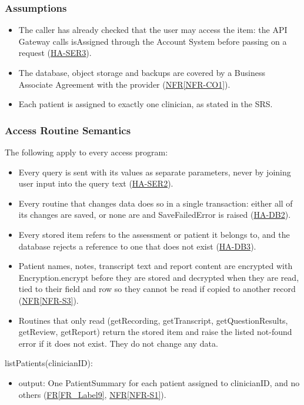\documentclass[12pt, titlepage]{article}
\newcommand{\srsref}[2]{\href{https://github.com/Nour-Fawaz/MacaBoca/blob/main/pdfs/SRS/SRS.pdf}{#1\ref*{#2}}}
\newcommand{\hazref}[1]{\href{https://github.com/Nour-Fawaz/MacaBoca/blob/main/pdfs/HazardAnalysis/HazardAnalysis.pdf}{#1}}
\begin{document}
\subsubsection{Assumptions}
\begin{itemize}
\item The caller has already checked that the user may access the item: the API Gateway calls isAssigned through the Account System before passing on a request (\hazref{HA-SER3}).
\item The database, object storage and backups are covered by a Business Associate Agreement with the provider (\srsref{NFR}{NFR-CO1}).
\item Each patient is assigned to exactly one clinician, as stated in the SRS.
\end{itemize}

\subsubsection{Access Routine Semantics}

The following apply to every access program:
\begin{itemize}
\item Every query is sent with its values as separate parameters, never by joining user input into the query text (\hazref{HA-SER2}).
\item Every routine that changes data does so in a single transaction: either all of its changes are saved, or none are and SaveFailedError is raised (\hazref{HA-DB2}).
\item Every stored item refers to the assessment or patient it belongs to, and the database rejects a reference to one that does not exist (\hazref{HA-DB3}).
\item Patient names, notes, transcript text and report content are encrypted with Encryption.encrypt before they are stored and decrypted when they are read, tied to their field and row so they cannot be read if copied to another record (\srsref{NFR}{NFR-S3}).
\item Routines that only read (getRecording, getTranscript, getQuestionResults, getReview, getReport) return the stored item and raise the listed not-found error if it does not exist. They do not change any data.
\end{itemize}

\noindent listPatients(clinicianID):
\begin{itemize}
\item output: One PatientSummary for each patient assigned to clinicianID, and no others (\srsref{FR}{FR_Label9}, \srsref{NFR}{NFR-S1}).
\end{itemize}
\end{document}
